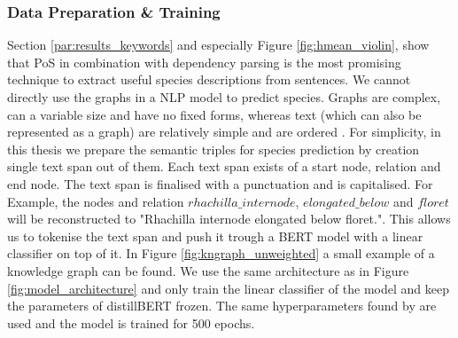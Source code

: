 \documentclass[a4paper, 12pt, oneside]{book} %
\begin{document}
\subsubsection{Data Preparation \& Training} \label{par:pos_training}
Section \ref{par:results_keywords} and especially Figure \ref{fig:hmean_violin}, show that PoS in combination with dependency parsing is the most promising technique to extract useful species descriptions from sentences.
We cannot directly use the graphs in a NLP model to predict species.
Graphs are complex, can a variable size and have no fixed forms, whereas text (which can also be represented as a graph) are relatively simple and are ordered \autocite{sanchez-lengeling_gentle_2021}. 
For simplicity, in this thesis we prepare the semantic triples for species prediction by creation single text span out of them.
Each text span exists of a start node, relation and end node.
The text span is finalised with a punctuation and is capitalised.
For Example, the nodes and relation $rhachilla\_internode$, $elongated\_below$ and $floret$ will be reconstructed to "Rhachilla internode elongated below floret.".
This allows us to tokenise the text span and push it trough a BERT model with a linear classifier on top of it.
In Figure \ref{fig:kngraph_unweighted} a small example of a knowledge graph can be found.
We use the same architecture as in Figure \ref{fig:model_architecture} and only train the linear classifier of the model and keep the parameters of distillBERT frozen.
The same hyperparameters found by \textcite{sun_how_2020} are used and the model is trained for 500 epochs.
\end{document}
